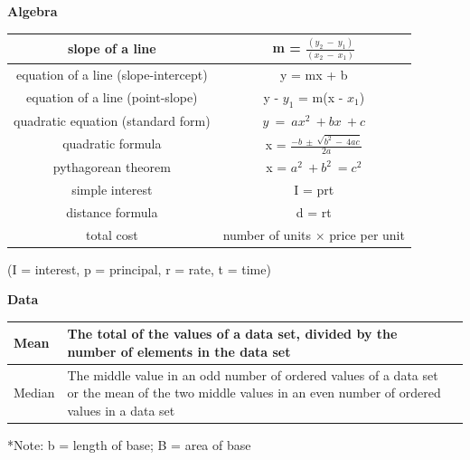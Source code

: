 \documentclass[12pt]{article}
\begin{document}
\vspace{0.8 cm}
\textbf{Algebra}\\
\begin{tabular}{ |c| |c| }
\hline
slope of a line & m = $\frac{(y_2 \: - \: y_1)}{(x_2 \: - \: x_1)}$  \\ 
\hline
equation of a line (slope-intercept) & y = mx + b  \\ 
\hline
equation of a line (point-slope) & y - $y_1$ = m(x - $x_1$) \\ 
\hline
quadratic equation (standard form) & $y \: = \: ax^2 \: + bx \: + c$ \\
\hline 
quadratic formula & x = $\frac{-b \: \pm \: \sqrt{b^2 \: - \: 4ac}}{2a}$ \\
\hline
pythagorean theorem & x = $a^2 \: + b^2 \: = c^2$ \\
\hline
simple interest & I = prt \\
\hline
distance formula & d = rt \\
\hline
total cost & number of units $\times$ price per unit \\
\hline
\end{tabular}

(I = interest, p = principal, r = rate, t = time)

\vspace{0.8 cm}
\textbf{Data}\\
\begin{tabular}{ |l|p{14cm}|c| }
\hline
Mean & The total of the values of a data set, divided by the number of elements in the data set \\
\hline
Median & The middle value in an odd number of ordered values of a data set or the mean of the two middle values in an even number of ordered values in a data set \\
\hline
\end{tabular}

\vspace{2.0 cm}

*Note: b = length of base; B = area of base
\end{document}
